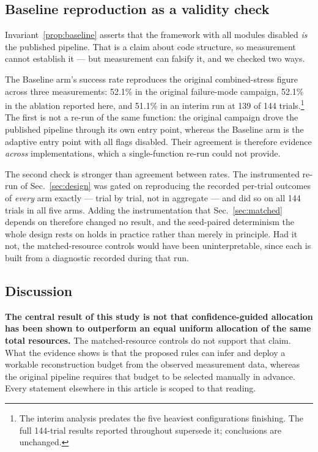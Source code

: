 \documentclass[preprint,11pt]{elsarticle}
\begin{document}
\subsection{Baseline reproduction as a validity check}
\label{sec:baselinecheck}

Invariant~\ref{prop:baseline} asserts that the framework with all modules
disabled \emph{is} the published pipeline. That is a claim about code
structure, so measurement cannot establish it --- but measurement can
falsify it, and we checked two ways.

The Baseline arm's success rate reproduces the original combined-stress
figure across three measurements: 52.1\% in the original failure-mode
campaign, 52.1\% in the ablation reported here, and 51.1\% in an interim
run at 139 of 144 trials.\footnote{The interim analysis predates the five
heaviest configurations finishing. The full 144-trial results reported
throughout supersede it; conclusions are unchanged.} The first is not a
re-run of the same function: the original campaign drove the published
pipeline through its own entry point, whereas the Baseline arm is the
adaptive entry point with all flags disabled. Their agreement is
therefore evidence \emph{across} implementations, which a single-function
re-run could not provide.

The second check is stronger than agreement between rates. The
instrumented re-run of Sec.~\ref{sec:design} was gated on reproducing the
recorded per-trial outcomes of \emph{every} arm exactly --- trial by
trial, not in aggregate --- and did so on all 144 trials in all five arms.
Adding the instrumentation that Sec.~\ref{sec:matched} depends on
therefore changed no result, and the seed-paired determinism the whole
design rests on holds in practice rather than merely in principle. Had it
not, the matched-resource controls would have been uninterpretable, since
each is built from a diagnostic recorded during that run.

\subsection{Discussion}
\label{sec:discussion}

\textbf{The central result of this study is not that confidence-guided
allocation has been shown to outperform an equal uniform allocation of
the same total resources.} The matched-resource controls do not support
that claim. What the evidence shows is that the proposed rules can infer
and deploy a workable reconstruction budget from the observed measurement
data, whereas the original pipeline requires that budget to be selected
manually in advance. Every statement elsewhere in this article is scoped
to that reading.
\end{document}
